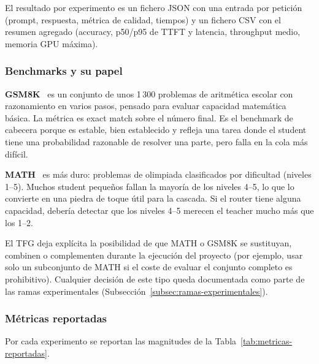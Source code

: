 \documentclass[11pt,a4paper]{article}
\begin{document}
El resultado por experimento es un fichero JSON con una entrada por petición (prompt, respuesta, métrica de calidad, tiempos) y un fichero CSV con el resumen agregado (accuracy, p50/p95 de TTFT y latencia, throughput medio, memoria GPU máxima).

\subsubsection{Benchmarks y su papel}

\textbf{GSM8K}~\cite{cobbe2021gsm8k} es un conjunto de unos 1\,300 problemas de aritmética escolar con razonamiento en varios pasos, pensado para evaluar capacidad matemática básica. La métrica es exact match sobre el número final. Es el benchmark de cabecera porque es estable, bien establecido y refleja una tarea donde el student tiene una probabilidad razonable de resolver una parte, pero falla en la cola más difícil.

\textbf{MATH}~\cite{hendrycks2021math} es más duro: problemas de olimpiada clasificados por dificultad (niveles 1--5). Muchos student pequeños fallan la mayoría de los niveles 4--5, lo que lo convierte en una piedra de toque útil para la cascada. Si el router tiene alguna capacidad, debería detectar que los niveles 4--5 merecen el teacher mucho más que los 1--2.

El TFG deja explícita la posibilidad de que MATH o GSM8K se sustituyan, combinen o complementen durante la ejecución del proyecto (por ejemplo, usar solo un subconjunto de MATH si el coste de evaluar el conjunto completo es prohibitivo). Cualquier decisión de este tipo queda documentada como parte de las ramas experimentales (Subsección~\ref{subsec:ramas-experimentales}).

\subsubsection{Métricas reportadas}

Por cada experimento se reportan las magnitudes de la Tabla~\ref{tab:metricas-reportadas}.
\end{document}
